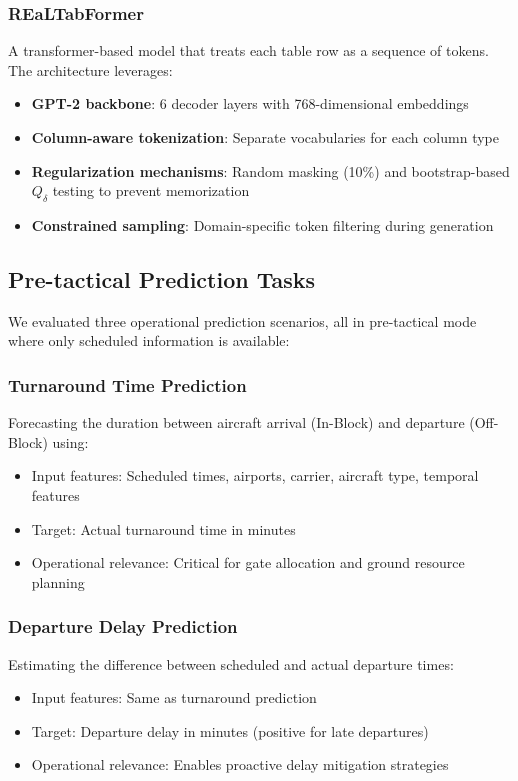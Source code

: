\documentclass[conference]{IEEEtran}
\begin{document}
\subsubsection{REaLTabFormer} \cite{solatorio2023realtabformer}
A transformer-based model that treats each table row as a sequence of tokens. The architecture leverages:
\begin{itemize}
    \item \textbf{GPT-2 backbone}: 6 decoder layers with 768-dimensional embeddings
    \item \textbf{Column-aware tokenization}: Separate vocabularies for each column type
    \item \textbf{Regularization mechanisms}: Random masking (10\%) and bootstrap-based $Q_\delta$ testing to prevent memorization
    \item \textbf{Constrained sampling}: Domain-specific token filtering during generation
\end{itemize}

\subsection{Pre-tactical Prediction Tasks}

We evaluated three operational prediction scenarios, all in pre-tactical mode where only scheduled information is available:

\subsubsection{Turnaround Time Prediction}
Forecasting the duration between aircraft arrival (In-Block) and departure (Off-Block) using:
\begin{itemize}
    \item Input features: Scheduled times, airports, carrier, aircraft type, temporal features
    \item Target: Actual turnaround time in minutes
    \item Operational relevance: Critical for gate allocation and ground resource planning
\end{itemize}

\subsubsection{Departure Delay Prediction}
Estimating the difference between scheduled and actual departure times:
\begin{itemize}
    \item Input features: Same as turnaround prediction
    \item Target: Departure delay in minutes (positive for late departures)
    \item Operational relevance: Enables proactive delay mitigation strategies
\end{itemize}
\end{document}
